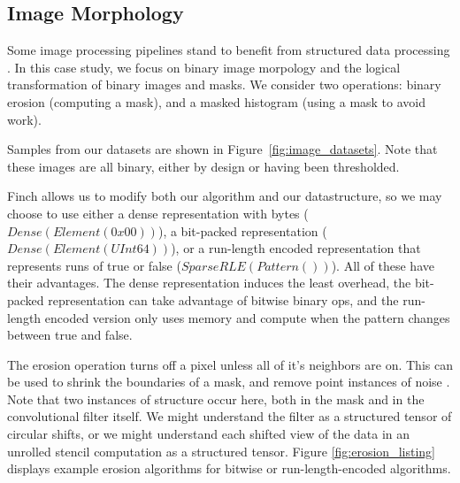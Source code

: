 \subsection{Image Morphology}

Some image processing pipelines stand to benefit from structured data processing \cite{donenfeld_unified_2022}.
In this case study, we focus on binary image morpology and the logical transformation of binary images and masks.
We consider two operations: binary erosion (computing a mask), and a masked histogram (using a mask to avoid work).

Samples from our datasets are shown in Figure~\ref{fig:image_datasets}. Note that these images are all binary, either by design or having been thresholded.

Finch allows us to modify both our algorithm and our datastructure, so we may choose to use either a dense representation with bytes ($Dense(Element(0x00))$), a bit-packed representation ($Dense(Element(UInt64))$), or a run-length encoded representation that represents runs of true or false ($SparseRLE(Pattern())$).
%
All of these have their advantages.
%
The dense representation induces the least overhead, the bit-packed representation can take advantage of bitwise binary ops, and the run-length encoded version only uses memory and compute when the pattern changes between true and false.

The erosion operation turns off a pixel unless all of it's neighbors are on.
%
This can be used to shrink the boundaries of a mask, and remove point instances of noise \cite{fisher_hypermedia_1996}.
%
Note that two instances of structure occur here, both in the mask and in the convolutional filter itself.
%
We might understand the filter as a structured tensor of circular shifts, or we might understand each shifted view of the data in an unrolled stencil computation as a structured tensor.
Figure \ref{fig:erosion_listing} displays example erosion algorithms for bitwise or
run-length-encoded algorithms.

